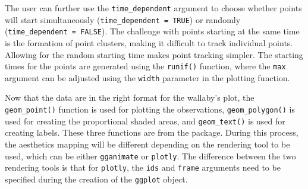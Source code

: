 The user can further use the \texttt{time\_dependent} argument to choose whether points will start simultaneously (\texttt{time\_dependent\ =\ TRUE}) or randomly (\texttt{time\_dependent\ =\ FALSE}). The challenge with points starting at the same time is the formation of point clusters, making it difficult to track individual points. Allowing for the random starting time makes point tracking simpler. The starting times for the points are generated using the \texttt{runif()} function, where the \texttt{max} argument can be adjusted using the \texttt{width} parameter in the plotting function.

Now that the data are in the right format for the wallaby's plot, the \texttt{geom\_point()} function is used for plotting the observations, \texttt{geom\_polygon()} is used for creating the proportional shaded areas, and \texttt{geom\_text()} is used for creating labels. These three functions are from the  package. During this process, the aesthetics mapping will be different depending on the rendering tool to be used, which can be either \texttt{gganimate} or \texttt{plotly}. The difference between the two rendering tools is that for \texttt{plotly}, the \texttt{ids} and \texttt{frame} arguments need to be specified during the creation of the \texttt{ggplot} object.

